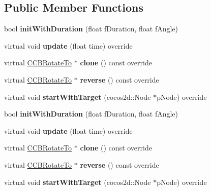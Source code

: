 \subsection*{Public Member Functions}
\begin{DoxyCompactItemize}
\item 
\mbox{\label{classcocosbuilder_1_1CCBRotateTo_ab4f6f575970cf401aba61b1e66279824}} 
bool {\bfseries init\+With\+Duration} (float f\+Duration, float f\+Angle)
\item 
\mbox{\label{classcocosbuilder_1_1CCBRotateTo_a476d792f6ee4b54b322943140bd29920}} 
virtual void {\bfseries update} (float time) override
\item 
\mbox{\label{classcocosbuilder_1_1CCBRotateTo_a31398cf129ebb3070c6dc7e82b9801e6}} 
virtual \hyperlink{classcocosbuilder_1_1CCBRotateTo}{C\+C\+B\+Rotate\+To} $\ast$ {\bfseries clone} () const override
\item 
\mbox{\label{classcocosbuilder_1_1CCBRotateTo_a370ce02c378bb7a02185af77f68f5d55}} 
virtual \hyperlink{classcocosbuilder_1_1CCBRotateTo}{C\+C\+B\+Rotate\+To} $\ast$ {\bfseries reverse} () const override
\item 
\mbox{\label{classcocosbuilder_1_1CCBRotateTo_adc6a4fc35e2ef1a6f0cac2f3c85858ae}} 
virtual void {\bfseries start\+With\+Target} (cocos2d\+::\+Node $\ast$p\+Node) override
\item 
\mbox{\label{classcocosbuilder_1_1CCBRotateTo_ab4f6f575970cf401aba61b1e66279824}} 
bool {\bfseries init\+With\+Duration} (float f\+Duration, float f\+Angle)
\item 
\mbox{\label{classcocosbuilder_1_1CCBRotateTo_ae3ca1848b4f36449c4eb1f74969f77e5}} 
virtual void {\bfseries update} (float time) override
\item 
\mbox{\label{classcocosbuilder_1_1CCBRotateTo_a9dc0232839f899dca1f2623fa10a3b70}} 
virtual \hyperlink{classcocosbuilder_1_1CCBRotateTo}{C\+C\+B\+Rotate\+To} $\ast$ {\bfseries clone} () const override
\item 
\mbox{\label{classcocosbuilder_1_1CCBRotateTo_af15f66a059115ae8358f5787517f7da9}} 
virtual \hyperlink{classcocosbuilder_1_1CCBRotateTo}{C\+C\+B\+Rotate\+To} $\ast$ {\bfseries reverse} () const override
\item 
\mbox{\label{classcocosbuilder_1_1CCBRotateTo_a9cbf09583a8082e52354b33bc47002c5}} 
virtual void {\bfseries start\+With\+Target} (cocos2d\+::\+Node $\ast$p\+Node) override
\end{DoxyCompactItemize}
